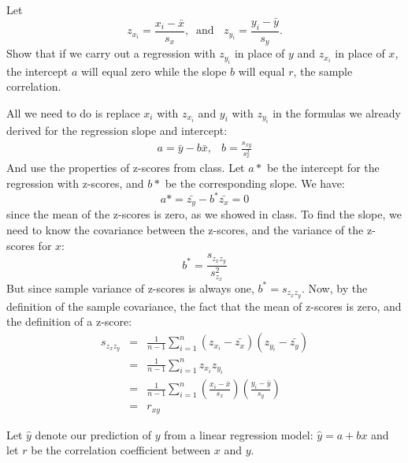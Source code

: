\documentclass[addpoints,12pt]{exam}
\begin{document}
\begin{questions}
  \question Let
    $$z_{x_i} = \frac{x_i - \bar{x}}{s_x}, \;\;\mbox{and }\;\; z_{y_i} = \frac{y_i - \bar{y}}{s_y}.$$
    Show that if we carry out a regression with $z_{y_i}$ in place of $y$ and $z_{x_i}$ in place of $x$, the intercept $a$ will equal zero while the slope $b$ will equal $r$, the sample correlation.
    \begin{solution}
     All we need to do is replace $x_i$ with $z_{x_i}$ and $y_i$ with $z_{y_i}$ in the formulas we already derived for the regression slope and intercept:
     		$$\begin{array}{lr}a = \bar{y} - b\bar{x}, & b = \displaystyle \frac{s_{xy}}{s_x^2}\end{array}$$
     		And use the properties of z-scores from class. Let $a*$ be the intercept for the regression with z-scores, and $b*$ be the corresponding slope. We have:
     	 	$$a* = \bar{z_y} - b^* \bar{z_x} = 0$$
     	 	since the mean of the z-scores is zero, as we showed in class. To find the slope, we need to know the covariance between the z-scores, and the variance of the z-scores for $x$:
     	 		$$b^* = \frac{s_{z_x z_y}}{s_{z_x}^2}$$
     	 		But since sample variance of z-scores is always one, $b^* = s_{z_x z_y}$. Now, by the definition of the sample covariance, the fact that the mean of z-scores is zero, and the definition of a z-score:
     	 		\begin{eqnarray*}
     	 		s_{z_x z_y} &=& \frac{1}{n-1} \sum_{i=1}^n (z_{x_i} - \bar{z_x})(z_{y_i} - \bar{z_y})\\
     	 		&=& \frac{1}{n-1} \sum_{i=1}^n z_{x_i}z_{y_i}\\
     	 		&=& \frac{1}{n-1} \sum_{i=1}^n \left(\frac{x_i - \bar{x}}{s_x}\right)\left(\frac{y_i - \bar{y}}{s_y}\right)\\
     	 		&=& r_{xy}
     	 		\end{eqnarray*}
    \end{solution}

\question Let $\hat{y}$ denote our prediction of $y$ from a linear regression model: $\hat{y} = a + b x$ and let $r$ be the correlation coefficient between $x$ and $y$.
\end{questions}
\end{document}
